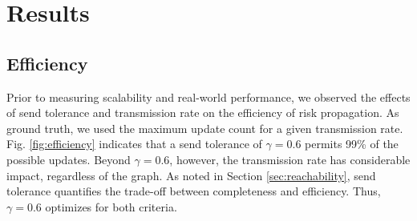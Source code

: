 \section{Results}
\subsection{Efficiency}

\par Prior to measuring scalability and real-world performance, we observed the effects of send tolerance and transmission rate on the efficiency of risk propagation. As ground truth, we used the maximum update count for a given transmission rate. Fig. \ref{fig:efficiency} indicates that a send tolerance of $\gamma = 0.6$ permits 99\% of the possible updates. Beyond $\gamma = 0.6$, however, the transmission rate has considerable impact, regardless of the graph. As noted in Section \ref{sec:reachability}, send tolerance quantifies the trade-off between completeness and efficiency. Thus, $\gamma = 0.6$ optimizes for both criteria.

